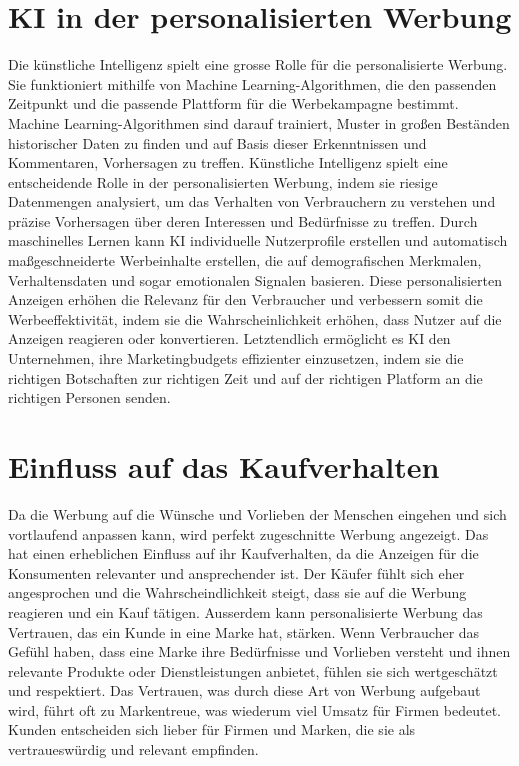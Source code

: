 \documentclass{article}
\begin{document}
 \section{KI in der personalisierten Werbung}

 Die künstliche Intelligenz spielt eine grosse Rolle für die personalisierte Werbung. Sie funktioniert mithilfe von Machine Learning-Algorithmen, die den passenden Zeitpunkt und die passende Plattform für die Werbekampagne bestimmt. Machine Learning-Algorithmen sind darauf trainiert, Muster in großen Beständen historischer Daten zu finden und auf Basis dieser Erkenntnissen und Kommentaren, Vorhersagen zu treffen.
 Künstliche Intelligenz spielt eine entscheidende Rolle in der personalisierten Werbung, indem sie riesige Datenmengen analysiert, um das Verhalten von Verbrauchern zu verstehen und präzise Vorhersagen über deren Interessen und Bedürfnisse zu treffen. Durch maschinelles Lernen kann KI individuelle Nutzerprofile erstellen und automatisch maßgeschneiderte Werbeinhalte erstellen, die auf demografischen Merkmalen, Verhaltensdaten und sogar emotionalen Signalen basieren. Diese personalisierten Anzeigen erhöhen die Relevanz für den Verbraucher und verbessern somit die Werbeeffektivität, indem sie die Wahrscheinlichkeit erhöhen, dass Nutzer auf die Anzeigen reagieren oder konvertieren. Letztendlich ermöglicht es KI den Unternehmen, ihre Marketingbudgets effizienter einzusetzen, indem sie die richtigen Botschaften zur richtigen Zeit und auf der richtigen Platform an die richtigen Personen senden.

 \section{Einfluss auf das Kaufverhalten}
Da die Werbung auf die Wünsche und Vorlieben der Menschen eingehen und sich vortlaufend anpassen kann, wird perfekt zugeschnitte Werbung angezeigt. Das hat einen erheblichen Einfluss auf ihr Kaufverhalten, da die Anzeigen für die Konsumenten relevanter und ansprechender ist. Der Käufer fühlt sich eher angesprochen und die Wahrscheindlichkeit steigt, dass sie auf die Werbung reagieren und ein Kauf tätigen. Ausserdem kann personalisierte Werbung das Vertrauen, das ein Kunde in eine Marke hat, stärken. Wenn Verbraucher das Gefühl haben, dass eine Marke ihre Bedürfnisse und Vorlieben versteht und ihnen relevante Produkte oder Dienstleistungen anbietet, fühlen sie sich wertgeschätzt und respektiert. Das Vertrauen, was durch diese Art von Werbung aufgebaut wird, führt oft zu Markentreue, was wiederum viel Umsatz für Firmen bedeutet. Kunden entscheiden sich lieber für Firmen und Marken, die sie als vertraueswürdig und relevant empfinden. 
\end{document}
